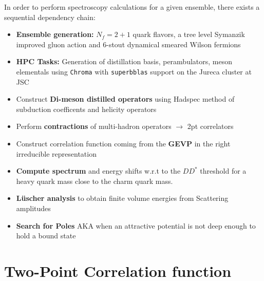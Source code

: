 In order to perform spectroscopy calculations for a given ensemble, there exists a sequential dependency chain:
\begin{itemize}
     \setlength\itemsep{1em}
        \item[\checkmark] \textbf{Ensemble generation:} $N_f = 2+1$ quark flavors, a tree level Symanzik improved gluon action and 6-stout dynamical smeared Wilson fermions
        \item[\checkmark] \textbf{HPC Tasks:} Generation of distillation basis, perambulators, meson elementals using \texttt{Chroma} with \texttt{superbblas} support on the Jureca cluster at JSC
        \item Construct \textbf{Di-meson distilled operators} using Hadspec method of subduction coefficents and helicity operators
        \item[\checkmark] Perform \textbf{contractions} of multi-hadron operators $\to$ 2pt correlators
        \item Construct correlation function coming from the \textbf{GEVP} in the right irreducible representation
        \item \textbf{Compute spectrum} and energy shifts w.r.t to the $DD^*$ threshold for a heavy quark mass close to the charm quark mass.
        \item \textbf{L\"uscher analysis} to obtain finite volume energies from Scattering amplitudes
        \item \textbf{Search for Poles} AKA when an attractive potential is not deep enough to hold a bound state
    \end{itemize}


\section{Two-Point Correlation function} 